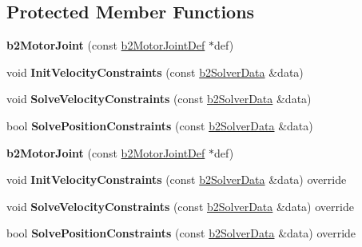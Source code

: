 \subsection*{Protected Member Functions}
\begin{DoxyCompactItemize}
\item 
\mbox{\label{classb2MotorJoint_ac0c56b069910915e1ceef3b89c035833}} 
{\bfseries b2\+Motor\+Joint} (const \hyperlink{structb2MotorJointDef}{b2\+Motor\+Joint\+Def} $\ast$def)
\item 
\mbox{\label{classb2MotorJoint_a49d04e78d28f21491a93d1946f584da2}} 
void {\bfseries Init\+Velocity\+Constraints} (const \hyperlink{structb2SolverData}{b2\+Solver\+Data} \&data)
\item 
\mbox{\label{classb2MotorJoint_a06a8ccfab3121daa119d548cbb19593c}} 
void {\bfseries Solve\+Velocity\+Constraints} (const \hyperlink{structb2SolverData}{b2\+Solver\+Data} \&data)
\item 
\mbox{\label{classb2MotorJoint_a78b06e3e03eb211f85504f2d9ef66863}} 
bool {\bfseries Solve\+Position\+Constraints} (const \hyperlink{structb2SolverData}{b2\+Solver\+Data} \&data)
\item 
\mbox{\label{classb2MotorJoint_ac0c56b069910915e1ceef3b89c035833}} 
{\bfseries b2\+Motor\+Joint} (const \hyperlink{structb2MotorJointDef}{b2\+Motor\+Joint\+Def} $\ast$def)
\item 
\mbox{\label{classb2MotorJoint_aeffac9d1e3940c362962319d1bdb3f22}} 
void {\bfseries Init\+Velocity\+Constraints} (const \hyperlink{structb2SolverData}{b2\+Solver\+Data} \&data) override
\item 
\mbox{\label{classb2MotorJoint_a620c75b301aeab409f9d50a041a80fb8}} 
void {\bfseries Solve\+Velocity\+Constraints} (const \hyperlink{structb2SolverData}{b2\+Solver\+Data} \&data) override
\item 
\mbox{\label{classb2MotorJoint_a4e56455ab7e90f82fc1f463efc9b59de}} 
bool {\bfseries Solve\+Position\+Constraints} (const \hyperlink{structb2SolverData}{b2\+Solver\+Data} \&data) override
\end{DoxyCompactItemize}
